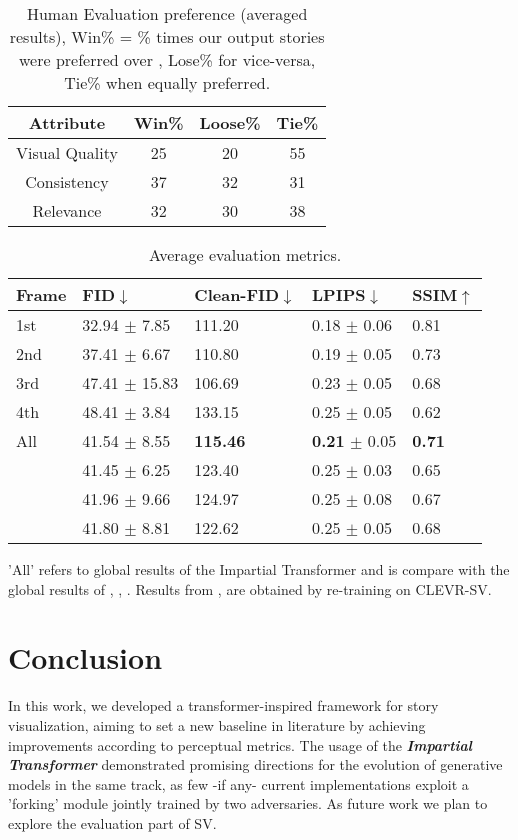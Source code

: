 \documentclass{article}
\begin{document}
\begin{table}[htp]
\centering
\caption{Human Evaluation preference (averaged results), Win\% = \% times our output stories were preferred
over \cite{storygan}, Lose\% for vice-versa, Tie\% when equally preferred.}
\label{tab:human_eval}
  \begin{tabular}{cccc}
    \toprule
    Attribute & Win\% & Loose\% & Tie\%\\
    \midrule
    Visual Quality & 25& 20 & 55\\
    Consistency & 37& 32& 31 \\
    Relevance  & 32& 30& 38\\
  \bottomrule
\end{tabular}
\end{table}

\begin{table}[t!]
\caption{Average evaluation metrics. }
\label{tab:global}
\begin{tabular}{p{20pt}|p{57pt}p{42pt}p{50pt}p{20pt}}
\toprule
Frame & FID$\downarrow$ & Clean-FID$\downarrow$ & LPIPS$\downarrow$ & SSIM$\uparrow$  \\
\midrule
1st & 32.94 $\pm$ 7.85 & 111.20  & 0.18 $\pm$ 0.06 & 0.81  \\
2nd & 37.41 $\pm$ 6.67 & 110.80  & 0.19 $\pm$ 0.05 & 0.73  \\
3rd & 47.41 $\pm$ 15.83 & 106.69  & 0.23 $\pm$ 0.05 & 0.68\\
4th  & 48.41 $\pm$ 3.84 & 133.15  & 0.25 $\pm$ 0.05 & 0.62  \\
\midrule
All & 41.54 $\pm$ 8.55 & \textbf{115.46} & \textbf{0.21} $\pm$ 0.05 & \textbf{0.71}  \\
\cite{storygan} & 41.45 $\pm$ 6.25 & 123.40 & 0.25 $\pm$ 0.03 & 0.65\\
\cite{Maharana2021IntegratingVL} & 41.96 $\pm$ 9.66 &  124.97 &  0.25 $\pm$ 0.08 &  0.67 \\
\cite{Maharana2021ImprovingGA}  & 41.80 $\pm$ 8.81 &  122.62 &  0.25 $\pm$ 0.05 &  0.68 \\
\bottomrule
\end{tabular}
\footnotesize{'All' refers to global results of the Impartial Transformer and is compare with the global results of \cite{storygan}, \cite{Maharana2021IntegratingVL}, \cite{Maharana2021ImprovingGA}. Results from \cite{Maharana2021IntegratingVL}, \cite{Maharana2021ImprovingGA} are obtained by re-training on CLEVR-SV.}
\end{table}

\section{Conclusion}
In this work, we developed a transformer-inspired framework for story visualization, aiming to set a new baseline in literature by achieving improvements according to perceptual metrics. The usage of the \textit{\textbf{Impartial Transformer}} demonstrated promising directions for the evolution of generative models in the same track, as few -if any- current implementations exploit a 'forking' module jointly trained by two adversaries. As future work we plan to explore the evaluation part of SV.





\end{document}
